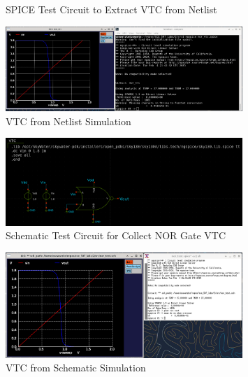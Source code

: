 \documentclass{article}
\begin{document}
	\begin{figure}[H]
		
		\caption{SPICE Test Circuit to Extract VTC from Netlist}
		\label{fig::nor_vtc_test_circuit}
	\end{figure}
	
	\begin{figure}[H]
		\centerline{\includegraphics[width=0.8\textwidth]{nor_vtc.png}}
		\caption{VTC from Netlist Simulation}
		\label{fig::nor_vtc}
	\end{figure}
	
	\begin{figure}[H]
		\centerline{\includegraphics[width=0.8\textwidth]{nor_vtc_test_circuit.png}}
		\caption{Schematic Test Circuit for Collect NOR Gate VTC}
		\label{fig::nor_vtc_schem_test_circuit}
	\end{figure}
	
	\begin{figure}[H]
		\centerline{\includegraphics[width=0.8\textwidth]{nor_vtc_schem.png}}
		\caption{VTC from Schematic Simulation}
		\label{fig::nor_vtc_schem}
	\end{figure}
	
\end{document}
